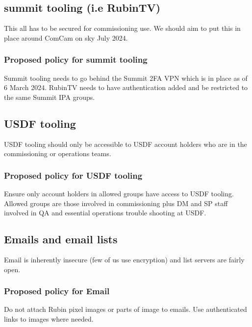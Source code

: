 \subsection{summit tooling (i.e RubinTV)}
This all has to be secured for commissioning use.
We should aim to put this in place around ComCam on sky July 2024.

\subsubsection{Proposed policy for summit tooling}
Summit tooling needs to go behind the Summit 2FA VPN which is in place as of 6 March 2024.
RubinTV needs to have authentication added and be restricted to the same Summit IPA groups.

\subsection{USDF tooling}
USDF tooling should only be accessible to USDF account holders who are in the commissioning or operations teams.
\subsubsection{Proposed policy for USDF tooling}
Ensure only account holders in allowed groups have access to USDF tooling.
Allowed groups are those involved in commissioning plus DM and SP staff involved in QA and essential operations trouble shooting at USDF.

\subsection{Emails and email  lists }
Email is inherently insecure (few of us use encryption) and list servers are fairly open.

\subsubsection{Proposed policy for Email}
Do not attach Rubin pixel images or parts of image to emails.
Use authenticated links to images where needed.


